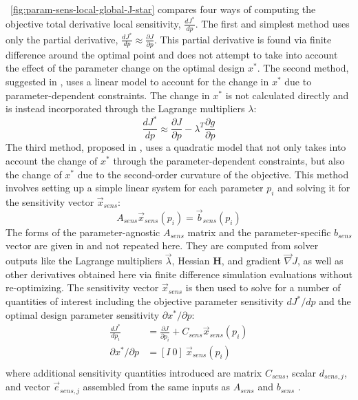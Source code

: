 \figureautorefname~\ref{fig:param-sens-local-global-J-star} compares four ways of computing the objective total derivative local sensitivity, $\frac{dJ^*}{dp}$.
The first and simplest method uses only the partial derivative, $\frac{dJ^*}{dp}\approx \frac{\partial J}{\partial p}$.
This partial derivative is found via finite difference around the optimal point and does not attempt to take into account the effect of the parameter change on the optimal design $x^*$.
The second method, suggested in \cite{martins_engineering_2022}, uses a linear model to account for the change in $x^*$ due to parameter-dependent constraints.
The change in $x^*$ is not calculated directly and is instead incorporated through the Lagrange multipliers $\lambda$:
\begin{equation}
\frac{dJ^*}{dp} \approx \frac{\partial J}{\partial p} -  \lambda^T \frac{\partial g}{\partial p}
\end{equation}
The third method, proposed in \cite{sobieszczanski-sobieski_sensitivity_1982}, uses a quadratic model that not only takes into account the change of $x^*$ through the parameter-dependent constraints, but also the change of $x^*$ due to the second-order curvature of the objective.
This method involves setting up a simple linear system for each parameter $p_i$ and solving it for the sensitivity vector $\vec{x}_{sens}$:
\begin{equation}
    A_{sens} \vec{x}_{sens}(p_i) = \vec{b}_{sens}(p_i)
\end{equation}
The forms of the parameter-agnostic $A_{sens}$ matrix and the parameter-specific $b_{sens}$ vector are given in \cite{sobieszczanski-sobieski_sensitivity_1982} and not repeated here.
They are computed from solver outputs like the Lagrange multipliers $\vec{\lambda}$, Hessian $\mathbf{H}$, and gradient $\vec{\nabla} J$, as well as other derivatives %
obtained here via finite difference simulation evaluations %
without re-optimizing.
The sensitivity vector $\vec{x}_{sens}$ is then used to solve for a number of quantities of interest including the objective parameter sensitivity $dJ^*/dp$ and the optimal design parameter sensitivity $\partial x^*/\partial p$:%
\begin{equation}
\begin{aligned}
    \frac{dJ^*}{dp_i} &=  \frac{\partial J}{\partial p_i} + C_{sens}\vec{x}_{sens}(p_i) \\
    \partial x^*/\partial p &=  [I ~0] ~\vec{x}_{sens}(p_i) \\
\end{aligned}
\end{equation}
where additional sensitivity quantities introduced are matrix $C_{sens}$, scalar $d_{sens,j}$, and vector $\vec{e}_{sens,j}$ assembled from the same inputs as $A_{sens}$ and $b_{sens}$ \cite{sobieszczanski-sobieski_sensitivity_1982}.

